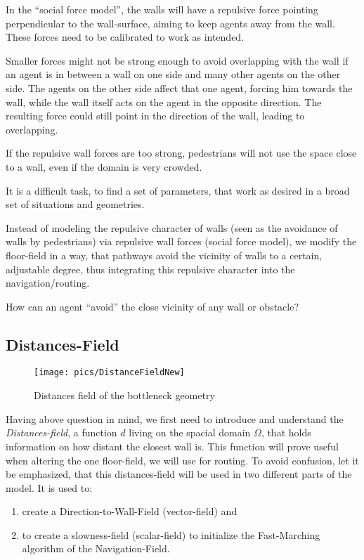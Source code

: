 In the ``social force model'', the walls will have a repulsive force pointing perpendicular to the wall-surface, aiming to keep agents away from the wall. These forces need to be calibrated to work as intended.

Smaller forces might not be strong enough to avoid overlapping with the wall if an agent is in between a wall on one side and many other agents on the other side. The agents on the other side affect that one agent, forcing him towards the wall, while the wall itself acts on the agent in the opposite direction. The resulting force could still point in the direction of the wall, leading to overlapping.

If the repulsive wall forces are too strong, pedestrians will not use the space close to a wall, even if the domain is very crowded.

It is a difficult task, to find a set of parameters, that work as desired in a broad set of situations and geometries.

Instead of modeling the repulsive character of walls (seen as the avoidance of walls by pedestrians) via repulsive wall forces (social force model), we modify the floor-field in a way, that pathways avoid the vicinity of walls to a certain, adjustable degree, thus integrating this repulsive character into the navigation/routing.

How can an agent ``avoid'' the close vicinity of any wall or obstacle?

\subsection{Distances-Field}
\begin{figure}[h!]
\texttt{[image: pics/DistanceFieldNew]}
\caption{Distances field of the bottleneck geometry}
\label{fig:DistanceField2}
\end{figure}
Having above question in mind, we first need to introduce and understand the \textit{Distances-field}, a function $d$ living on the spacial domain $\Omega$, that holds information on how distant the closest wall is. This function will prove useful when altering the one floor-field, we will use for routing. To avoid confusion, let it be emphasized, that this distances-field will be used in two different parts of the model. It is used to:
\begin{enumerate}
\item create a Direction-to-Wall-Field (vector-field) and
\item to create a slowness-field (scalar-field) to initialize the Fast-Marching algorithm of the Navigation-Field.
\end{enumerate}

